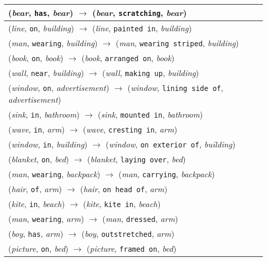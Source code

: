 \documentclass[runningheads]{llncs}
\begin{document}
{\begin{longtable}{ l }
(\textit{bear}, \texttt{has}, \textit{bear}) $\rightarrow$ (\textit{bear}, \texttt{scratching}, \textit{bear}) \\ \hline
(\textit{line}, \texttt{on}, \textit{building}) $\rightarrow$ (\textit{line}, \texttt{painted in}, \textit{building}) \\ \hline
(\textit{man}, \texttt{wearing}, \textit{building}) $\rightarrow$ (\textit{man}, \texttt{wearing striped}, \textit{building}) \\ \hline
(\textit{book}, \texttt{on}, \textit{book}) $\rightarrow$ (\textit{book}, \texttt{arranged on}, \textit{book}) \\ \hline
(\textit{wall}, \texttt{near}, \textit{building}) $\rightarrow$ (\textit{wall}, \texttt{making up}, \textit{building}) \\ \hline
(\textit{window}, \texttt{on}, \textit{advertisement}) $\rightarrow$ (\textit{window}, \texttt{lining side of}, \textit{advertisement}) \\ \hline
(\textit{sink}, \texttt{in}, \textit{bathroom}) $\rightarrow$ (\textit{sink}, \texttt{mounted in}, \textit{bathroom}) \\ \hline
(\textit{wave}, \texttt{in}, \textit{arm}) $\rightarrow$ (\textit{wave}, \texttt{cresting in}, \textit{arm}) \\ \hline
(\textit{window}, \texttt{in}, \textit{building}) $\rightarrow$ (\textit{window}, \texttt{on exterior of}, \textit{building}) \\ \hline
(\textit{blanket}, \texttt{on}, \textit{bed}) $\rightarrow$ (\textit{blanket}, \texttt{laying over}, \textit{bed}) \\ \hline
(\textit{man}, \texttt{wearing}, \textit{backpack}) $\rightarrow$ (\textit{man}, \texttt{carrying}, \textit{backpack}) \\ \hline
(\textit{hair}, \texttt{of}, \textit{arm}) $\rightarrow$ (\textit{hair}, \texttt{on head of}, \textit{arm}) \\ \hline
(\textit{kite}, \texttt{in}, \textit{beach}) $\rightarrow$ (\textit{kite}, \texttt{kite in}, \textit{beach}) \\ \hline
(\textit{man}, \texttt{wearing}, \textit{arm}) $\rightarrow$ (\textit{man}, \texttt{dressed}, \textit{arm}) \\ \hline
(\textit{boy}, \texttt{has}, \textit{arm}) $\rightarrow$ (\textit{boy}, \texttt{outstretched}, \textit{arm}) \\ \hline
(\textit{picture}, \texttt{on}, \textit{bed}) $\rightarrow$ (\textit{picture}, \texttt{framed on}, \textit{bed}) \\ \hline

\end{longtable}}
\end{document}
